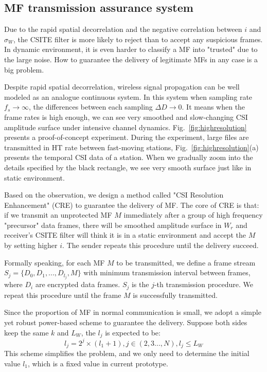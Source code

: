 \documentclass[conference]{IEEEtran}
\begin{document}
\subsection{MF transmission assurance system}
\label{subsec:assurance}

Due to the rapid spatial decorrelation and the negative correlation
between $i$ and $\sigma_W$,
the CSITE filter is more likely to reject than to accept any suspicious frames.
In dynamic environment, it is even harder to classify a MF into "trusted" due to the large noise.
How to guarantee the delivery of legitimate MFs in any case is a big problem.

Despite rapid spatial decorrelation, wireless signal propagation can be well modeled as
an analogue continuous system. In this system when sampling rate $f_s\rightarrow \infty$, the differences between each sampling $\Delta D\rightarrow0$.
It means when the frame rates is high enough, we can see very smoothed and slow-changing CSI amplitude surface under intensive channel dynamics.
Fig.~\ref{fig:highresolution} presents a proof-of-concept experiment.
During the experiment, large files are transmitted in HT rate between fast-moving stations, Fig.~\ref{fig:highresolution}(a) presents the temporal CSI data of a station. When
 we gradually zoom into the details specified by the black rectangle, we
 see very smooth surface just like in static environment.


Based on the observation, we design a method called "CSI Resolution Enhancement" (CRE)
to guarantee the delivery of MF. The core of CRE is that:
if we transmit an unprotected
MF $M$ immediately after a group of high frequency
"precursor" data frames,
there will be smoothed amplitude surface in $W_r$
and receiver's CSITE filter will think
it is in a static environment and accept the $M$ by setting higher $i$.
The sender repeats this procedure until the delivery succeed.

Formally speaking, for each MF $M$ to be transmitted,
we define a frame stream
 $S_j=\{D_0,D_1,...,D_{l_{j}},M\}$ with minimum
 transmission interval between frames, where $D_i$ are encrypted data frames.
 $S_j$ is the $j$-th transmission procedure.
 We repeat this procedure until the frame $M$ is successfully transmitted.


Since the proportion of MF in normal communication is small,
we adopt a simple yet robust power-based scheme to guarantee the delivery. Suppose
both sides keep the same $k$ and $L_W$, the $l_{j}$ is expected to be:
\begin{equation}
l_{j}=2^{j}\times (l_{1}+1), j \in(2,3...,N), l_{j} \le L_W
\end{equation}
This scheme simplifies the problem, and we only need to determine the
initial value $l_{1}$, which  is a fixed value in current prototype.
\end{document}
